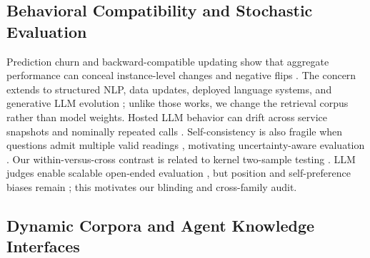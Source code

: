 \documentclass[sigconf,nonacm]{acmart}
\begin{document}
\subsection{Behavioral Compatibility and Stochastic Evaluation}

Prediction churn and backward-compatible updating show that aggregate performance can conceal instance-level changes and negative flips \cite{fard2016churn,bansal2019updates,bahri2021churn,yan2021positive, traeuble2021backward}.  The concern extends to structured NLP, data updates, deployed language systems, and generative LLM evolution \cite{cai2022regression,caciolai2023regression,schumann2024backward, echterhoff2024muscle}; unlike those works, we change the retrieval corpus rather than model weights.  Hosted LLM behavior can drift across service snapshots and nominally repeated calls \cite{chen2023chatgptdrift,atil2025nondeterminism}.  Self-consistency is also fragile when questions admit multiple valid readings \cite{bartsch2023selfconsistency}, motivating uncertainty-aware evaluation \cite{miller2024errorbars,madaan2024variance,lior2025reliableeval}. Our within-versus-cross contrast is related to kernel two-sample testing \cite{gretton2012mmd}.  LLM judges enable scalable open-ended evaluation \cite{zheng2023llmjudge,liu2023geval}, but position and self-preference biases remain \cite{zheng2023llmjudge,wang2024fairevaluators, panickssery2024selfpreference}; this motivates our blinding and cross-family audit.

\subsection{Dynamic Corpora and Agent Knowledge Interfaces}
\end{document}
